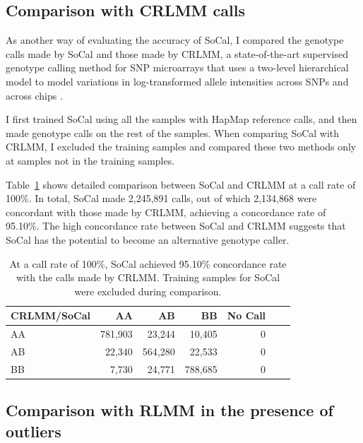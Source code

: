 \documentclass{scrartcl}
\begin{document}
\subsection{Comparison with CRLMM calls}

\par
As another way of evaluating the accuracy of SoCal, I compared the genotype
calls made by SoCal and those made by CRLMM, a state-of-the-art
supervised genotype calling method for SNP microarrays that uses a two-level
hierarchical model to model variations in log-transformed allele intensities
across SNPs and across chips \cite{carvalho2007}.

\par
I first trained SoCal using all the samples with HapMap reference calls, and
then made genotype calls on the rest of the samples.
When comparing SoCal with CRLMM, I excluded the training samples and compared
these two methods only at samples not in the training samples.

\par
Table~\ref{table:cmp_socal_crlmm} shows detailed comparison between SoCal
and CRLMM at a call rate of 100\%.
In total, SoCal made 2,245,891 calls, out of which 2,134,868 were concordant
with those made by CRLMM, achieving a concordance rate of 95.10\%.
The high concordance rate between SoCal and CRLMM suggests that SoCal has the
potential to become an alternative genotype caller.

\begin{table}[H]
\centering
\begin{tabular}{l*{5}{r}r}
    \hline
    CRLMM/SoCal   & AA       & AB      & BB      & No Call \\ \hline
    AA            & 781,903  & 23,244  & 10,405  & 0  \\
    AB            & 22,340   & 564,280 & 22,533  & 0  \\
    BB            & 7,730    & 24,771  & 788,685 & 0  \\ \hline
\end{tabular}
\caption{At a call rate of 100\%, SoCal achieved 95.10\% concordance rate
with the calls made by CRLMM. Training samples for SoCal were excluded during
comparison.}
\label{table:cmp_socal_crlmm}
\end{table}

\subsection{Comparison with RLMM in the presence of outliers}
\end{document}
